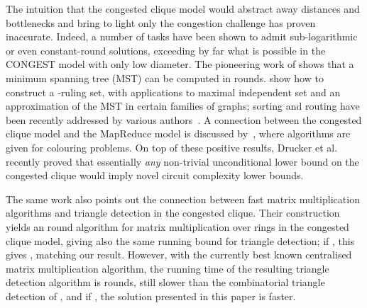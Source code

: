 The intuition that the congested clique model would abstract away distances and bottlenecks and bring to light only the congestion challenge has proven inaccurate.
Indeed, a number of tasks have been shown to admit sub-logarithmic or even constant-round solutions, exceeding by far what is possible in the CONGEST model with only low diameter. The pioneering work of \citet{lotker05} shows that a minimum spanning tree (MST) can be computed in  rounds. \citet{hegeman14} show how to construct a -ruling set, with applications to maximal independent set and an approximation of the MST in certain families of graphs; sorting and routing have been recently addressed by various authors~\cite{lenzen2013optimal,LenzenW11,patt-shamir11}. A connection between the congested clique model and the MapReduce model is discussed by~\citet{HegemanP14}, where algorithms are given for colouring problems. On top of these positive results, Drucker et al.~\cite{drucker13} recently proved that essentially \emph{any} non-trivial unconditional lower bound on the congested clique would imply novel circuit complexity lower bounds.

The same work also points out the connection between fast matrix multiplication algorithms and triangle detection in the congested clique. Their construction yields an  round algorithm for matrix multiplication over rings in the congested clique model, giving also the same running bound for triangle detection; if , this gives , matching our result. However, with the currently best known centralised matrix multiplication algorithm, the running time of the resulting triangle detection algorithm is  rounds, still slower than the combinatorial triangle detection of \citet{tritri}, and if , the solution presented in this paper is faster.


